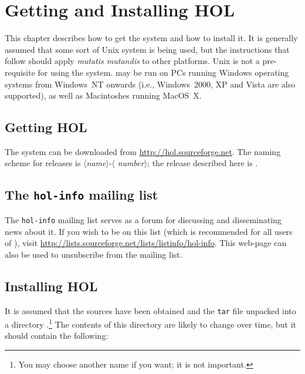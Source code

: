 \chapter{Getting and Installing HOL}
\label{install}

This chapter describes how to get the \HOL{} system and how to install
it.  It is generally assumed that some sort of Unix system is being
used, but the instructions that follow should apply {\it mutatis
  mutandis\/} to other platforms.  Unix is not a pre-requisite for
using the system. \HOL{} may be run on PCs running Windows operating
systems from Windows~NT onwards (i.e., Windows~2000, XP and Vista are
also supported), as well as Macintoshes running MacOS~X.

\section{Getting HOL}

The \HOL{} system can be downloaded from
\url{http://hol.sourceforge.net}.  The naming scheme for \holn{}
releases is $\langle${\it name}$\rangle$-$\langle${\it
  number}$\rangle$; the release described here is \holnversion.

\section{The {\tt hol-info} mailing list}

The \texttt{hol-info} mailing list serves as a forum for discussing
\HOL{} and disseminating news about it.  If you wish to be on this
list (which is recommended for all users of \HOL), visit
\url{http://lists.sourceforge.net/lists/listinfo/hol-info}.  This
web-page can also be used to unsubscribe from the mailing list.

\section{Installing HOL}

It is assumed that the \HOL{} sources have been obtained and the
\texttt{tar} file unpacked into a directory .\footnote{You may
  choose another name if you want; it is not important.} The contents
of this directory are likely to change over time, but it should
contain the following:

